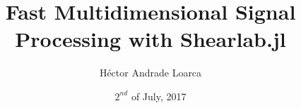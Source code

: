 \title[Fast Multidimensional Signal Processing with Shearlab.jl]{Fast Multidimensional Signal Processing with Shearlab.jl}
\author{H\'ector Andrade Loarca}
\date{$2^{nd}$ of July, 2017}

\newcommand{\mylogo}{\texttt{[image: Images/bms-logo-button.png]}}

\begin{frame}[plain]
	\titlepage
\end{frame}


